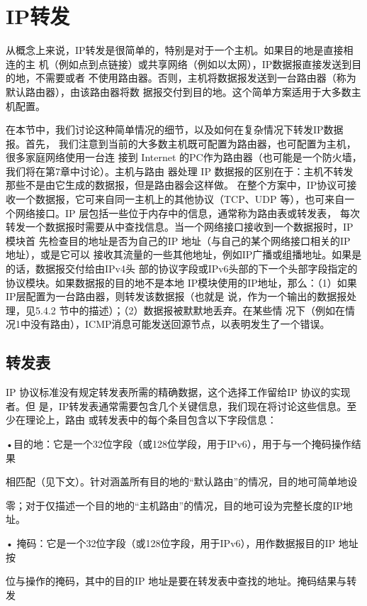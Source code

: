 \section{IP转发}

从概念上来说，IP转发是很简单的，特别是对于一个主机。如果目的地是直接相连的主
机（例如点到点链接）或共享网络（例如以太网），IP数据报直接发送到目的地，不需要或者
不使用路由器。否则，主机将数据报发送到一台路由器（称为默认路由器），由该路由器将数
据报交付到目的地。这个简单方案适用于大多数主机配置。

在本节中，我们讨论这种简单情况的细节，以及如何在复杂情况下转发IP数据报。首先，
我们注意到当前的大多数主机既可配置为路由器，也可配置为主机，很多家庭网络使用一台连
接到 Internet 的PC作为路由器（也可能是一个防火墙，我们将在第7章中讨论）。主机与路由
器处理 IP 数据报的区别在于：主机不转发那些不是由它生成的数据报，但是路由器会这样做。
在整个方案中，IP协议可接收一个数据报，它可来自同一主机上的其他协议（TCP、UDP
等），也可来自一个网络接口。IP 层包括一些位于内存中的信息，通常称为路由表或转发表，
每次转发一个数据报时需要从中查找信息。当一个网络接口接收到一个数据报时，IP模块首
先检查目的地址是否为自己的IP 地址（与自己的某个网络接口相关的IP 地址），或是它可以
接收其流量的一些其他地址，例如IP广播或组播地址。如果是的话，数据报交付给由IPv4头
部的协议字段或IPv6头部的下一个头部字段指定的协议模块。如果数据报的目的地不是本地
IP模块使用的IP地址，那么：（1）如果IP层配置为一台路由器，则转发该数据报（也就是
说，作为一个输出的数据报处理，见5.4.2 节中的描述）；（2）数据报被默默地丢弃。在某些情
况下（例如在情况1中没有路由），ICMP消息可能发送回源节点，以表明发生了一个错误。

\subsection{转发表}
IP 协议标准没有规定转发表所需的精确数据，这个选择工作留给IP 协议的实现者。但
是，IP转发表通常需要包含几个关键信息，我们现在将讨论这些信息。至少在理论上，路由
或转发表中的每个条目包含以下字段信息：

•目的地：它是一个32位字段（或128位学段，用于IPv6），用于与一个掩码操作结果

相匹配（见下文）。针对涵盖所有目的地的“默认路由”的情况，目的地可简单地设

零；对于仅描述一个目的地的“主机路由”的情况，目的地可设为完整长度的IP地址。

• 掩码：它是一个32位字段（或128位字段，用于IPv6），用作数据报目的IP 地址按

位与操作的掩码，其中的目的IP 地址是要在转发表中查找的地址。掩码结果与转发

